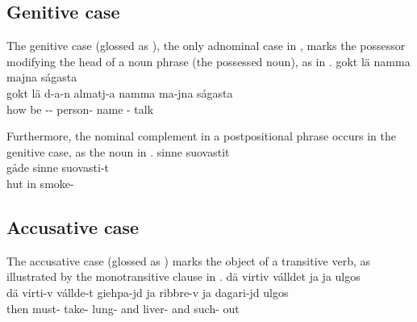 \subsection{Genitive case}\label{genitive}
The genitive case (glossed as \GENs), the only adnominal case in \PS, %
marks the possessor modifying the head of a noun phrase (the possessed noun), as in . 
\ea\label{gen1}
\glll	gokt lä   namma majna ságasta\\ %
	gokt lä d-a-n almatj-a namma ma-jna ságasta\\
	how be\BS{} -- person- name\BS{} - talk\BS{}\\\nopagebreak
{} 
\z

Furthermore, the nominal complement in a postpositional phrase occurs in the genitive case, as the noun  in .
\ea\label{gen2}
\glll {} sinne suovastit\\ %
	gåde sinne suovasti-t\\
	hut\BS{} in smoke-\\\nopagebreak
{} 
\z


\subsection{Accusative case}\label{accusative}
The accusative case (glossed as \ACCs) marks the object of a transitive verb, as illustrated by the monotransitive clause in .  
\ea\label{acc1}
\glll	dä virtiv válldet  ja  ja  ulgos\\ %
	dä virti-v vállde-t giehpa-jd ja ribbre-v ja dagari-jd ulgos\\
	then must- take- lung- and liver- and such- out\\\nopagebreak
{} 
\z

